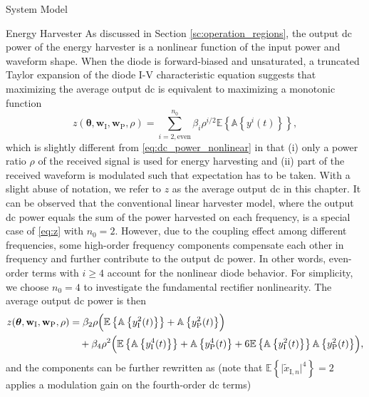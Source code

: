\begin{section}{System Model}
	\begin{subsection}{Energy Harvester}\label{sc:energy_harvester}
		As discussed in Section \ref{sc:operation_regions}, the output \gls{dc} power of the energy harvester is a nonlinear function of the input power and waveform shape.
		When the diode is forward-biased and unsaturated, a truncated Taylor expansion of the diode I-V characteristic equation suggests that maximizing the average output \gls{dc} is equivalent to maximizing a monotonic function \cite{Clerckx2018b}
		\begin{equation}\label{eq:z}
			z(\boldsymbol{\theta},\mathbf{w}_{\mathrm{I}},\mathbf{w}_{\mathrm{P}},\rho)=\sum_{i=2,\text{even}}^{n_0}{\beta_i}{\rho^{i/2}}{\mathbb{E}\left\{\mathbb{A}\left\{y^i(t)\right\}\right\}},
		\end{equation}
		which is slightly different from \eqref{eq:dc_power_nonlinear} in that (i) only a power ratio $\rho$ of the received signal is used for energy harvesting and (ii) part of the received waveform is modulated such that expectation has to be taken.
		With a slight abuse of notation, we refer to $z$ as the average output \gls{dc} in this chapter. It can be observed that the conventional linear harvester model, where the output \gls{dc} power equals the sum of the power harvested on each frequency, is a special case of \eqref{eq:z} with $n_0=2$. However, due to the coupling effect among different frequencies, some high-order frequency components compensate each other in frequency and further contribute to the output \gls{dc} power. In other words, even-order terms with $i \ge 4$ account for the nonlinear diode behavior. For simplicity, we choose $n_0=4$ to investigate the fundamental rectifier nonlinearity. The average output \gls{dc} power is then
		\begin{equation}
			\begin{split}
				z(\boldsymbol{\theta},\mathbf{w}_{\mathrm{I}},\mathbf{w}_{\mathrm{P}},\rho)
				& = \beta_2\rho\Bigl(\mathbb{E}\left\{\mathbb{A}\left\{y_{\mathrm{I}}^2(t)\right\}\right\}+\mathbb{A}\left\{y_{\mathrm{P}}^2(t)\right\}\Bigr)\\
				& \quad +\beta_4\rho^2\Bigl(\mathbb{E}\left\{\mathbb{A}\left\{y_{\mathrm{I}}^4(t)\right\}\right\}+\mathbb{A}\left\{y_{\mathrm{P}}^4(t)\right\}+6\mathbb{E}\left\{\mathbb{A}\left\{y_{\mathrm{I}}^2(t)\right\}\right\}\mathbb{A}\left\{y_{\mathrm{P}}^2(t)\right\}\Bigr),\label{eq:z_expand}
			\end{split}
		\end{equation}
		and the components can be further rewritten as (note that $\mathbb{E}\left\{\lvert\tilde{x}_{\mathrm{I},n}\rvert^4\right\}=2$ applies a modulation gain on the fourth-order \gls{dc} terms)

\end{subsection}
\end{section}
